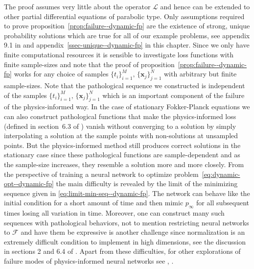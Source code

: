 The proof assumes very little about the operator $\mathcal L$ and hence can be extended to other partial differential equations of parabolic type. Only assumptions required to prove proposition~\ref{prop:failure--dynamic-fp} are the existence of strong, unique probability solutions which are true for all of our example problems, see appendix 9.1 in \cite{mandal2023learning} and appendix~\ref{ssec-unique--dynamic-fp} in this chapter. Since we only have finite computational resources it is sensible to investigate loss functions with finite sample-sizes and note that the proof of proposition~\ref{prop:failure--dynamic-fp} works for any choice of samples $\{t_i\}_{i=1}^M,\,\{\mathbf x_j\}_{j=1}^N$ with arbitrary but finite sample-sizes. Note that the pathological sequence we constructed is independent of the samples $\{t_i\}_{i=1}^M,\,\{\mathbf x_j\}_{j=1}^N$ which is an important component of the failure of the physics-informed way. In the case of stationary Fokker-Planck equations we can also construct pathological functions that make the physics-informed loss (defined in section~6.3 of \cite{mandal2023learning}) vanish without converging to a solution by simply interpolating a solution at the sample points with non-solutions at unsampled points. But the physics-informed method still produces correct solutions in the stationary case since these pathological functions are sample-dependent and as the sample-size increases, they resemble a solution more and more closely. From the perspective of training a neural network to optimize problem~\ref{eq:dynamic-opt--dynamic-fp} the main difficulty is revealed by the limit of the minimizing sequence given in \eqref{eq:limit-min-seq--dynamic-fp}. The network can behave like the initial condition for a short amount of time and then mimic $p_\infty$ for all subsequent times losing all variation in time. Moreover, one can construct many such sequences with pathological behaviors, not to mention restricting neural networks to $\mathcal{F}$ and have them be expressive is another challenge since normalization is an extremely difficult condition to implement in high dimensions, see the discussion in sections 2 and 6.4 of \cite{mandal2023learning}. Apart from these difficulties, for other explorations of failure modes of physics-informed neural networks see \cite{krishnapriyan2021characterizing}, \cite{basir2022investigating}.